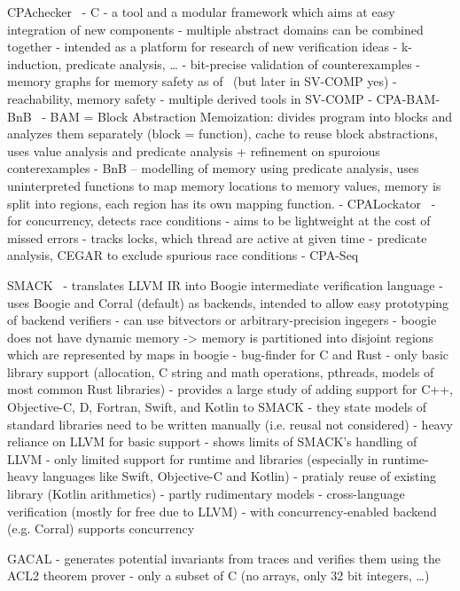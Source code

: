 CPAchecker~
- C
- a tool and a modular framework which aims at easy integration of new components
- multiple abstract domains can be combined together
- intended as a platform for research of new verification ideas
- k-induction, predicate analysis, …
- bit-precise validation of counterexamples
- memory graphs for memory safety as of~ (but later in SV-COMP yes)
- reachability, memory safety
- multiple derived tools in SV-COMP
  - CPA-BAM-BnB~
    - BAM = Block Abstraction Memoization: divides program into blocks and analyzes them separately (block = function), cache to reuse block abstractions, uses value analysis and predicate analysis + refinement on spuroious conterexamples
    - BnB -- modelling of memory using predicate analysis, uses uninterpreted functions to map memory locations to memory values, memory is split into regions, each region has its own mapping function.
  - CPALockator~
    - for concurrency, detects race conditions
    - aims to be lightweight at the cost of missed errors
    - tracks locks, which thread are active at given time
    - predicate analysis, CEGAR to exclude spurious race conditions
  - CPA-Seq

SMACK~
- translates LLVM IR into Boogie intermediate verification language
- uses Boogie and Corral (default) as backends, intended to allow easy prototyping of backend verifiers
- can use bitvectors or arbitrary-precision ingegers
- boogie does not have dynamic memory -> memory is partitioned into disjoint regions which are represented by maps in boogie
- bug-finder for C and Rust
  - only basic library support (allocation, C string and math operations, pthreads, models of most common Rust libraries)
-  provides a large study of adding support for C++, Objective-C, D, Fortran, Swift, and Kotlin to SMACK
  - they state models of standard libraries need to be written manually (i.e. reusal not considered)
  - heavy reliance on LLVM for basic support
  - shows limits of SMACK's handling of LLVM
  - only limited support for runtime and libraries (especially in runtime-heavy languages like Swift, Objective-C and Kotlin)
    - pratialy reuse of existing library (Kotlin arithmetics)
    - partly rudimentary models
  - cross-language verification (mostly for free due to LLVM)
- with concurrency-enabled backend (e.g. Corral) supports concurrency

GACAL
- generates potential invariants from traces and verifies them using the ACL2 theorem prover
- only a subset of C (no arrays, only 32 bit integers, …)

